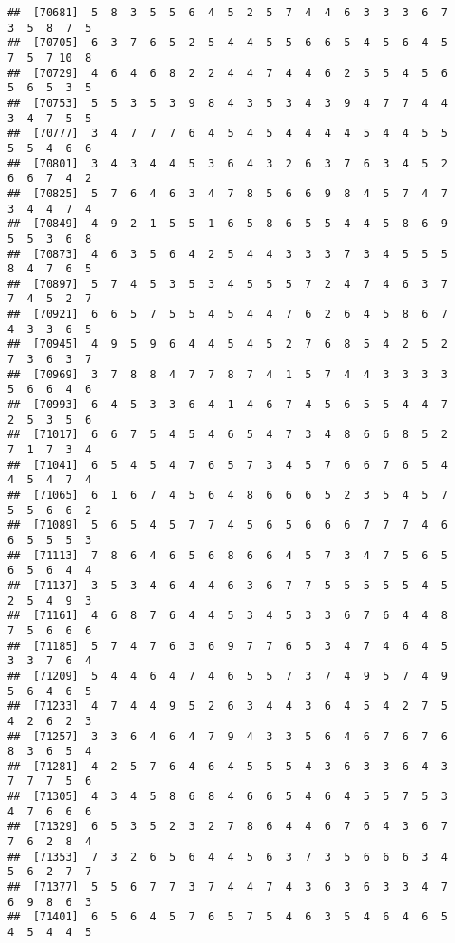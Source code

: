 \documentclass[
]{book}
\begin{document}
\begin{verbatim}
##  [70681]  5  8  3  5  5  6  4  5  2  5  7  4  4  6  3  3  3  6  7  3  5  8  7  5
##  [70705]  6  3  7  6  5  2  5  4  4  5  5  6  6  5  4  5  6  4  5  7  5  7 10  8
##  [70729]  4  6  4  6  8  2  2  4  4  7  4  4  6  2  5  5  4  5  6  5  6  5  3  5
##  [70753]  5  5  3  5  3  9  8  4  3  5  3  4  3  9  4  7  7  4  4  3  4  7  5  5
##  [70777]  3  4  7  7  7  6  4  5  4  5  4  4  4  4  5  4  4  5  5  5  5  4  6  6
##  [70801]  3  4  3  4  4  5  3  6  4  3  2  6  3  7  6  3  4  5  2  6  6  7  4  2
##  [70825]  5  7  6  4  6  3  4  7  8  5  6  6  9  8  4  5  7  4  7  3  4  4  7  4
##  [70849]  4  9  2  1  5  5  1  6  5  8  6  5  5  4  4  5  8  6  9  5  5  3  6  8
##  [70873]  4  6  3  5  6  4  2  5  4  4  3  3  3  7  3  4  5  5  5  8  4  7  6  5
##  [70897]  5  7  4  5  3  5  3  4  5  5  5  7  2  4  7  4  6  3  7  7  4  5  2  7
##  [70921]  6  6  5  7  5  5  4  5  4  4  7  6  2  6  4  5  8  6  7  4  3  3  6  5
##  [70945]  4  9  5  9  6  4  4  5  4  5  2  7  6  8  5  4  2  5  2  7  3  6  3  7
##  [70969]  3  7  8  8  4  7  7  8  7  4  1  5  7  4  4  3  3  3  3  5  6  6  4  6
##  [70993]  6  4  5  3  3  6  4  1  4  6  7  4  5  6  5  5  4  4  7  2  5  3  5  6
##  [71017]  6  6  7  5  4  5  4  6  5  4  7  3  4  8  6  6  8  5  2  7  1  7  3  4
##  [71041]  6  5  4  5  4  7  6  5  7  3  4  5  7  6  6  7  6  5  4  4  5  4  7  4
##  [71065]  6  1  6  7  4  5  6  4  8  6  6  6  5  2  3  5  4  5  7  5  5  6  6  2
##  [71089]  5  6  5  4  5  7  7  4  5  6  5  6  6  6  7  7  7  4  6  6  5  5  5  3
##  [71113]  7  8  6  4  6  5  6  8  6  6  4  5  7  3  4  7  5  6  5  6  5  6  4  4
##  [71137]  3  5  3  4  6  4  4  6  3  6  7  7  5  5  5  5  5  4  5  2  5  4  9  3
##  [71161]  4  6  8  7  6  4  4  5  3  4  5  3  3  6  7  6  4  4  8  7  5  6  6  6
##  [71185]  5  7  4  7  6  3  6  9  7  7  6  5  3  4  7  4  6  4  5  3  3  7  6  4
##  [71209]  5  4  4  6  4  7  4  6  5  5  7  3  7  4  9  5  7  4  9  5  6  4  6  5
##  [71233]  4  7  4  4  9  5  2  6  3  4  4  3  6  4  5  4  2  7  5  4  2  6  2  3
##  [71257]  3  3  6  4  6  4  7  9  4  3  3  5  6  4  6  7  6  7  6  8  3  6  5  4
##  [71281]  4  2  5  7  6  4  6  4  5  5  5  4  3  6  3  3  6  4  3  7  7  7  5  6
##  [71305]  4  3  4  5  8  6  8  4  6  6  5  4  6  4  5  5  7  5  3  4  7  6  6  6
##  [71329]  6  5  3  5  2  3  2  7  8  6  4  4  6  7  6  4  3  6  7  7  6  2  8  4
##  [71353]  7  3  2  6  5  6  4  4  5  6  3  7  3  5  6  6  6  3  4  5  6  2  7  7
##  [71377]  5  5  6  7  7  3  7  4  4  7  4  3  6  3  6  3  3  4  7  6  9  8  6  3
##  [71401]  6  5  6  4  5  7  6  5  7  5  4  6  3  5  4  6  4  6  5  4  5  4  4  5

\end{verbatim}
\end{document}
